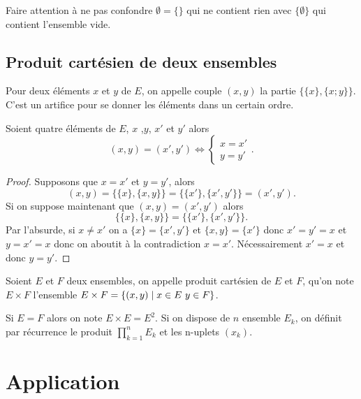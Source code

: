 Faire attention à ne pas confondre $\emptyset = \{\}$ qui ne contient rien avec $\{\emptyset\}$ qui contient l'ensemble
vide.

\subsection{Produit cartésien de deux ensembles}
\label{chap3-subsec:prodcart}
\begin{defdef}
  Pour deux éléments $x$ et $y$ de $E$, on appelle couple $(x,y)$ la partie $\{\{x\},\{x;y\}\}$. C'est un artifice pour se donner les éléments dans un certain ordre.
\end{defdef}
%
\begin{prop}
  Soient quatre éléments de $E$, $x$ ,$y$, $x'$ et $y'$ alors 
  \begin{equation} 
    (x,y)=(x',y') \iff \begin{cases} x=x' \\ y=y' \end{cases}.
  \end{equation}
\end{prop}
\begin{proof}
Supposons que $x=x'$ et $y=y'$, alors 
\begin{equation}
  (x,y)=\{\{x\},\{x,y\}\}=\{\{x'\},\{x',y'\}\}=(x',y').
\end{equation}
Si on suppose maintenant que $(x,y)=(x',y')$ alors 
\begin{equation}
  \{\{x\},\{x,y\}\}=\{\{x'\},\{x',y'\}\}.
\end{equation}
Par l'absurde, si $x \neq x'$ on a $\{x\}=\{x',y'\}$ et $\{x,y\} = \{x'\}$ donc $x'=y'=x$ et $y=x'=x$ donc on aboutit à la contradiction $x=x'$. Nécessairement $x'=x$ et donc $y=y'$.
\end{proof}
%
\begin{defdef}
  Soient $E$ et $F$ deux ensembles, on appelle produit cartésien de $E$ et $F$, qu'on note $E \times F$ l'ensemble $E
  \times F = \left\{(x,y)\mathrel{}\middle|\mathrel{}x \in E \ y \in F\right\}$.
\end{defdef}
Si $E=F$ alors on note $E \times E=E^2$. Si on dispose de $n$ ensemble $E_k$, on définit par récurrence le produit $\prod_{k=1}^n E_k$ et les n-uplets $(x_k)$.

\section{Application}
\label{chap3-sec:applications}
